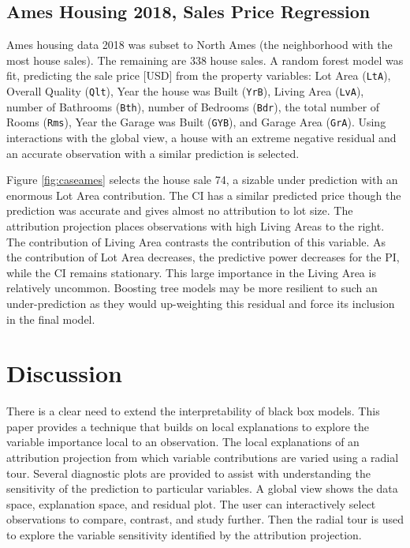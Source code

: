 \documentclass[
]{jss}
\begin{document}
\hypertarget{ames-housing-2018-sales-price-regression}{%
\subsection{Ames Housing 2018, Sales Price
Regression}\label{ames-housing-2018-sales-price-regression}}

Ames housing data 2018 \citep{de_cock_ames_2011, prevek18_ames_2018} was
subset to North Ames (the neighborhood with the most house sales). The
remaining are 338 house sales. A random forest model was fit, predicting
the sale price {[}USD{]} from the property variables: Lot Area
(\texttt{LtA}), Overall Quality (\texttt{Qlt}), Year the house was Built
(\texttt{YrB}), Living Area (\texttt{LvA}), number of Bathrooms
(\texttt{Bth}), number of Bedrooms (\texttt{Bdr}), the total number of
Rooms (\texttt{Rms}), Year the Garage was Built (\texttt{GYB}), and
Garage Area (\texttt{GrA}). Using interactions with the global view, a
house with an extreme negative residual and an accurate observation with
a similar prediction is selected.

Figure \ref{fig:caseames} selects the house sale 74, a sizable under
prediction with an enormous Lot Area contribution. The CI has a similar
predicted price though the prediction was accurate and gives almost no
attribution to lot size. The attribution projection places observations
with high Living Areas to the right. The contribution of Living Area
contrasts the contribution of this variable. As the contribution of Lot
Area decreases, the predictive power decreases for the PI, while the CI
remains stationary. This large importance in the Living Area is
relatively uncommon. Boosting tree models may be more resilient to such
an under-prediction as they would up-weighting this residual and force
its inclusion in the final model.

\hypertarget{sec:cheemdiscussion}{%
\section{Discussion}\label{sec:cheemdiscussion}}

There is a clear need to extend the interpretability of black box
models. This paper provides a technique that builds on local
explanations to explore the variable importance local to an observation.
The local explanations of an attribution projection from which variable
contributions are varied using a radial tour. Several diagnostic plots
are provided to assist with understanding the sensitivity of the
prediction to particular variables. A global view shows the data space,
explanation space, and residual plot. The user can interactively select
observations to compare, contrast, and study further. Then the radial
tour is used to explore the variable sensitivity identified by the
attribution projection.
\end{document}
